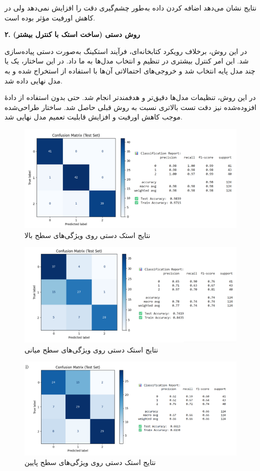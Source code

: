 \documentclass[a4paper,12pt]{article}
\begin{document}
نتایج نشان می‌دهد اضافه کردن داده به‌طور چشم‌گیری دقت را افزایش نمی‌دهد ولی در کاهش اورفیت مؤثر بوده است.

\textbf{۲. روش دستی (ساخت استک با کنترل بیشتر)}

در این روش، برخلاف رویکرد کتابخانه‌ای، فرآیند استکینگ به‌صورت دستی پیاده‌سازی شد. این امر کنترل بیشتری در تنظیم و انتخاب مدل‌ها به ما داد. در این ساختار، یک یا چند مدل پایه انتخاب شد و خروجی‌های احتمالاتی آن‌ها با استفاده از  استخراج شده و به مدل نهایی داده شد.

در این روش، تنظیمات مدل‌ها دقیق‌تر و هدفمندتر انجام شد. حتی بدون استفاده از دادهٔ افزوده‌شده نیز دقت تست بالاتری نسبت به روش قبلی حاصل شد. ساختار طراحی‌شده موجب کاهش اورفیت و افزایش قابلیت تعمیم مدل نهایی شد.

\begin{figure}[H]
	\centering
	\includegraphics[width=1\textwidth]{3-high.png}
	\caption*{نتایج استک دستی روی ویژگی‌های سطح بالا}
\end{figure}
\FloatBarrier
\begin{figure}[H]
	\centering
	\includegraphics[width=1\textwidth]{3-mid.png}
	\caption*{نتایج استک دستی روی ویژگی‌های سطح میانی}
\end{figure}
\FloatBarrier
\begin{figure}[H]
	\centering
	\includegraphics[width=1\textwidth]{3-low.png}
	\caption*{نتایج استک دستی روی ویژگی‌های سطح پایین}
\end{figure}
\FloatBarrier
\end{document}
